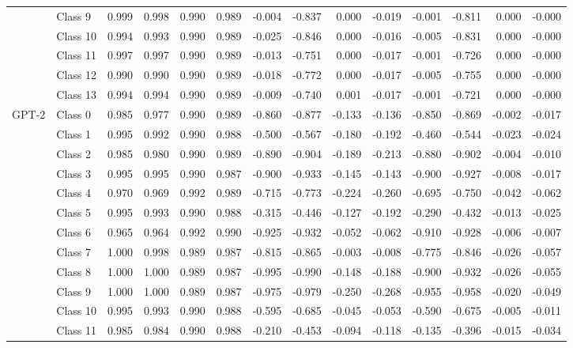 \begin{table*}[t]
\begin{tabular}{l|l|rrrr|rrrr|rrrr}
&Class 9 & 0.999 & 0.998 & 0.990 & 0.989 & -0.004 & -0.837 & 0.000 & -0.019 & -0.001 & -0.811 & 0.000 & -0.000 \\
&Class 10 & 0.994 & 0.993 & 0.990 & 0.989 & -0.025 & -0.846 & 0.000 & -0.016 & -0.005 & -0.831 & 0.000 & -0.000 \\
&Class 11 & 0.997 & 0.997 & 0.990 & 0.989 & -0.013 & -0.751 & 0.000 & -0.017 & -0.001 & -0.726 & 0.000 & -0.000 \\
&Class 12 & 0.990 & 0.990 & 0.990 & 0.989 & -0.018 & -0.772 & 0.000 & -0.017 & -0.005 & -0.755 & 0.000 & -0.000 \\
&Class 13 & 0.994 & 0.994 & 0.990 & 0.989 & -0.009 & -0.740 & 0.001 & -0.017 & -0.001 & -0.721 & 0.000 & -0.000 \\
\midrule
\multirow{14}{*}{GPT-2} 
&Class 0 & 0.985 & 0.977 & 0.990 & 0.989 & -0.860 & -0.877 & -0.133 & -0.136 & -0.850 & -0.869 & -0.002 & -0.017 \\
&Class 1 & 0.995 & 0.992 & 0.990 & 0.988 & -0.500 & -0.567 & -0.180 & -0.192 & -0.460 & -0.544 & -0.023 & -0.024 \\
&Class 2 & 0.985 & 0.980 & 0.990 & 0.989 & -0.890 & -0.904 & -0.189 & -0.213 & -0.880 & -0.902 & -0.004 & -0.010 \\
&Class 3 & 0.995 & 0.995 & 0.990 & 0.987 & -0.900 & -0.933 & -0.145 & -0.143 & -0.900 & -0.927 & -0.008 & -0.017 \\
&Class 4 & 0.970 & 0.969 & 0.992 & 0.989 & -0.715 & -0.773 & -0.224 & -0.260 & -0.695 & -0.750 & -0.042 & -0.062 \\
&Class 5 & 0.995 & 0.993 & 0.990 & 0.988 & -0.315 & -0.446 & -0.127 & -0.192 & -0.290 & -0.432 & -0.013 & -0.025 \\
&Class 6 & 0.965 & 0.964 & 0.992 & 0.990 & -0.925 & -0.932 & -0.052 & -0.062 & -0.910 & -0.928 & -0.006 & -0.007 \\
&Class 7 & 1.000 & 0.998 & 0.989 & 0.987 & -0.815 & -0.865 & -0.003 & -0.008 & -0.775 & -0.846 & -0.026 & -0.057 \\
&Class 8 & 1.000 & 1.000 & 0.989 & 0.987 & -0.995 & -0.990 & -0.148 & -0.188 & -0.900 & -0.932 & -0.026 & -0.055 \\
&Class 9 & 1.000 & 1.000 & 0.989 & 0.987 & -0.975 & -0.979 & -0.250 & -0.268 & -0.955 & -0.958 & -0.020 & -0.049 \\
&Class 10 & 0.995 & 0.993 & 0.990 & 0.988 & -0.595 & -0.685 & -0.045 & -0.053 & -0.590 & -0.675 & -0.005 & -0.011 \\
&Class 11 & 0.985 & 0.984 & 0.990 & 0.988 & -0.210 & -0.453 & -0.094 & -0.118 & -0.135 & -0.396 & -0.015 & -0.034 \\

\end{tabular}
\end{table*}
